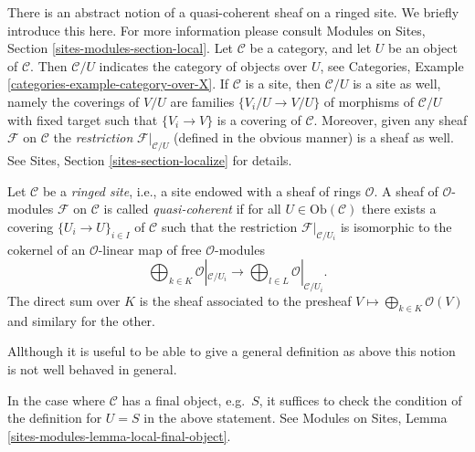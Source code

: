 \noindent
There is an abstract notion of a quasi-coherent sheaf on a ringed site.
We briefly introduce this here. For more information please consult
Modules on Sites, Section \ref{sites-modules-section-local}.
Let $\mathcal{C}$ be a category, and let $U$ be an object of $\mathcal{C}$.
Then $\mathcal{C}/U$ indicates the category of objects over $U$, see
Categories, Example \ref{categories-example-category-over-X}.
If $\mathcal{C}$ is a site, then $\mathcal{C}/U$ is a site as well, namely
the coverings of $V/U$ are families $\{V_i/U \to V/U\}$ of morphisms
of $\mathcal{C}/U$ with fixed target such that
$\{V_i \to V\}$ is a covering of $\mathcal{C}$. Moreover, given any
sheaf $\mathcal{F}$ on $\mathcal{C}$ the {\it restriction}
$\mathcal{F}|_{\mathcal{C}/U}$ (defined in the obvious manner)
is a sheaf as well. See
Sites, Section \ref{sites-section-localize}
for details.

\begin{definition}
\label{definition-ringed-site}
Let $\mathcal{C}$ be a {\it ringed site}, i.e., a site endowed with a
sheaf of rings $\mathcal{O}$. A sheaf of $\mathcal{O}$-modules $\mathcal{F}$ on
$\mathcal{C}$ is called {\it quasi-coherent} if for all
$U \in \text{Ob}(\mathcal{C})$ there exists a covering
$\{U_i \to U\}_{i\in I}$ of $\mathcal{C}$ such that the restriction
$\mathcal{F}|_{\mathcal{C}/U_i}$ is isomorphic to the cokernel of
an $\mathcal{O}$-linear map of free $\mathcal{O}$-modules
$$
\bigoplus\nolimits_{k \in K} \mathcal{O}|_{\mathcal{C}/U_i}
\longrightarrow
\bigoplus\nolimits_{l \in L} \mathcal{O}|_{\mathcal{C}/U_i}.
$$
The direct sum over $K$ is the sheaf associated to the presheaf
$V \mapsto \bigoplus_{k \in K} \mathcal{O}(V)$ and similary for the other.
\end{definition}

\noindent
Allthough it is useful to be able to give a general definition as above
this notion is not well behaved in general.

\begin{remark}
\label{remark-final-object}
In the case where $\mathcal{C}$ has a final object, e.g.\ $S$, it
suffices to check the condition of the definition for
$U = S$ in the above statement. See
Modules on Sites, Lemma \ref{sites-modules-lemma-local-final-object}.
\end{remark}

